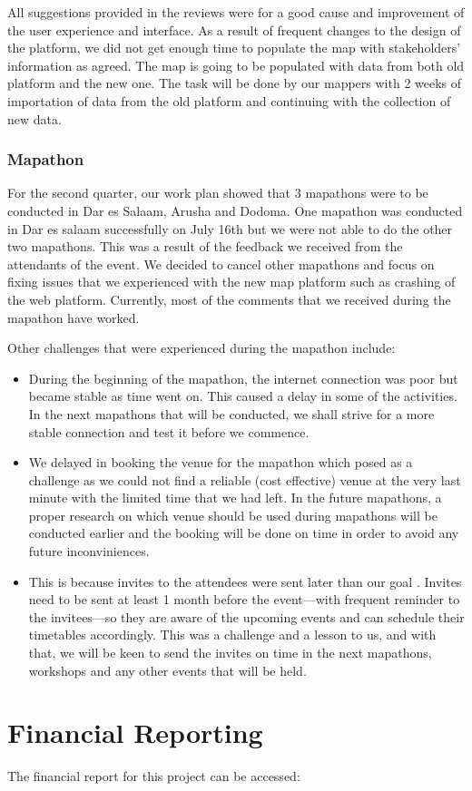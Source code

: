 \documentclass[a4paper,12pt,twoside]{article}
\begin{document}
All suggestions provided in the reviews were for a good cause and improvement of the user experience and interface. As a result of frequent changes to the design of the platform, we did not get enough time to populate the map with stakeholders’ information as agreed. The map is going to be populated with data from both old platform and the new one. The task will be done by our mappers with 2 weeks of importation of data from the old platform and continuing with the collection of new data.

\subsubsection{Mapathon}
For the second quarter, our work plan showed that 3 mapathons were to be conducted in Dar es Salaam, Arusha and Dodoma. One mapathon was conducted in Dar es salaam successfully on July 16th but we were not able to do the other two mapathons. This was a result of the feedback we received from the attendants of the event. We decided to cancel other mapathons and focus on fixing issues that we experienced with the new map platform such as crashing of the web platform. Currently, most of the comments that we received during the mapathon have worked.

Other challenges that were experienced during the mapathon include:
\begin{itemize}
    \item \color[OMDTZblue]{Internet connection:} During the beginning of the mapathon, the internet connection was poor but became stable as time went on. This caused a delay in some of the activities. In the next mapathons that will be conducted, we shall strive for a more stable connection and test it before we commence.
    
    \item \color[OMDTZblue]{Venue of the mapathon:} We delayed in booking the venue for the mapathon which posed as a challenge as we could not find a reliable (cost effective) venue at the very last minute with the limited time that we had left. In the future mapathons, a proper research on which venue should be used during mapathons will be conducted earlier and the booking will be done on time in order to avoid any future inconviniences.
    
    \item \color[OMDTZblue]{Attendance to the mapathon was lower than expected:} This is because invites to the attendees were sent later than our goal . Invites need to be sent at least 1 month before the event---with frequent reminder to the invitees---so they are aware of the upcoming events and can schedule their timetables accordingly. This was a challenge and a lesson to us, and with that, we will be keen to send the invites on time in the next mapathons, workshops and any other events that will be held.
\end{itemize}

\section{Financial Reporting}
The financial report for this project can be accessed:
\end{document}
